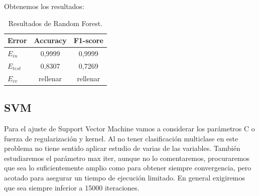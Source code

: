 \documentclass[11pt,a4paper]{article}
\begin{document}
Obtenemos los resultados:

\begin{table}[h]
\begin{center}
\begin{tabular}{|l|c|c|}
\hline
  Error & Accuracy & F1-score \\ \hline
  $E_{in}$ & 0,9999 & 0,9999 \\
  $E_{test}$ & 0,8307 & 0,7269  \\
  $E_{cv}$ & rellenar & rellenar  \\\hline
\end{tabular}
\caption{Resultados de Random Forest.}
\end{center}
\end{table}

\newpage\hfill
\newpage
\subsection{SVM\cite{svc}}

Para el ajuste de Support Vector Machine vamos a considerar los parámetros C o fuerza de regularización y kernel. Al no tener clasificación multiclase en este problema no tiene sentido aplicar estudio de varias de las variables. También estudiaremos el parámetro max iter, aunque no lo comentaremos, procuraremos que sea lo suficientemente amplio como para obtener siempre convergencia, pero acotado para asegurar un tiempo de ejecución limitado. En general exigiremos que sea siempre inferior a 15000 iteraciones.
\end{document}
